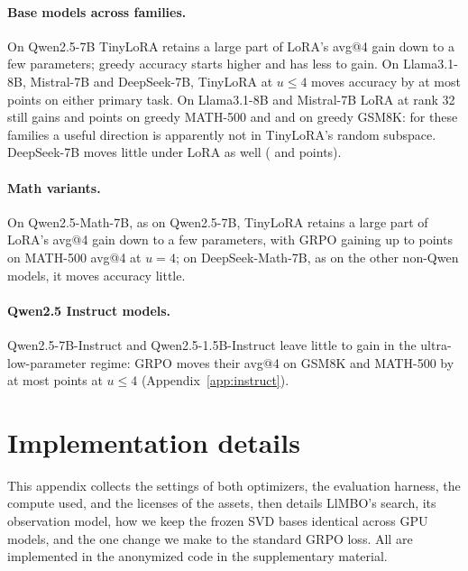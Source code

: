 \documentclass[twoside]{article}
\newcommand{\llmbo}{LlMBO}
\begin{document}
\paragraph{Base models across families.}
On Qwen2.5-7B TinyLoRA retains a large part of LoRA's avg@4 gain down to a few parameters; greedy accuracy starts higher and has less to gain. On Llama3.1-8B, Mistral-7B and DeepSeek-7B, TinyLoRA at $u \le 4$ moves accuracy by at most \othersTinyBest{} points on either primary task. On Llama3.1-8B and Mistral-7B LoRA at rank 32 still gains \loraGainGreedyLlamaMathFive{} and \loraGainGreedyMistralMathFive{} points on greedy MATH-500 and \loraGainGreedyLlamaGsm{} and \loraGainGreedyMistralGsm{} on greedy GSM8K: for these families a useful direction is apparently not in TinyLoRA's random subspace. DeepSeek-7B moves little under LoRA as well (\loraGainGreedyDeepseekBaseMathFive{} and \loraGainGreedyDeepseekBaseGsm{} points).

\paragraph{Math variants.}
On Qwen2.5-Math-7B, as on Qwen2.5-7B, TinyLoRA retains a large part of LoRA's avg@4 gain down to a few parameters, with GRPO gaining up to \gainGrpoMeanMathUFourMathFive{} points on MATH-500 avg@4 at $u = 4$; on DeepSeek-Math-7B, as on the other non-Qwen models, it moves accuracy little.

\paragraph{Qwen2.5 Instruct models.}
Qwen2.5-7B-Instruct and Qwen2.5-1.5B-Instruct leave little to gain in the ultra-low-parameter regime: GRPO moves their avg@4 on GSM8K and MATH-500 by at most \grpoBestInstruct{} points at $u \le 4$ (Appendix~\ref{app:instruct}).

\FloatBarrier
\clearpage
\section{Implementation details}
\label{app:impl}
This appendix collects the settings of both optimizers, the evaluation harness, the compute used, and the licenses of the assets, then details \llmbo{}'s search, its observation model, how we keep the frozen SVD bases identical across GPU models, and the one change we make to the standard GRPO loss. All are implemented in the anonymized code in the supplementary material.
\end{document}
